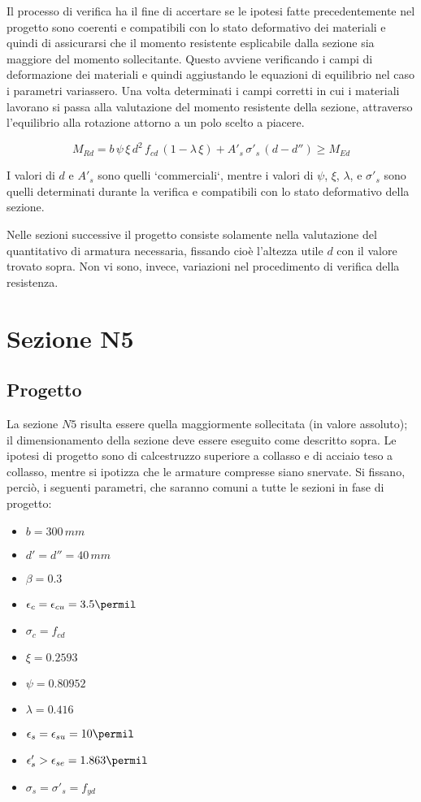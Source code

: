 Il processo di verifica ha il fine di accertare se le ipotesi fatte precedentemente nel progetto sono coerenti e compatibili con lo stato deformativo dei materiali e quindi di assicurarsi che il momento resistente esplicabile dalla sezione sia maggiore del momento sollecitante. Questo avviene verificando i campi di deformazione dei materiali e quindi aggiustando le equazioni di equilibrio nel caso i parametri variassero. Una volta determinati i campi corretti in cui i materiali lavorano si passa alla valutazione del momento resistente della sezione, attraverso l'equilibrio alla rotazione attorno a un polo scelto a piacere. 

\begin{equation}
	\label{eq:MRd}
	M_{Rd} = b\,\psi\,\xi\,d^2\,f_{cd}\,\left(1-\lambda\,\xi\right) + A'_s\,\sigma'_s\,\left(d-d''\right) \geq M_{Ed}
\end{equation}

I valori di $d$ e $A'_s$ sono quelli `commerciali`, mentre i valori di $\psi$, $\xi$, $\lambda$, e $\sigma'_s$ sono quelli determinati durante la verifica e compatibili con lo stato deformativo della sezione.

Nelle sezioni successive il progetto consiste solamente nella valutazione del quantitativo di armatura necessaria, fissando cioè l'altezza utile $d$ con il valore trovato sopra. Non vi sono, invece, variazioni nel procedimento di verifica della resistenza.

\section{Sezione N5}\label{sec:n5}
\subsection{Progetto}
La sezione $N5$ risulta essere quella maggiormente sollecitata (in valore assoluto); il dimensionamento della sezione deve essere eseguito come descritto sopra. Le ipotesi di progetto sono di calcestruzzo superiore a collasso e di acciaio teso a collasso, mentre si ipotizza che le armature compresse siano snervate. Si fissano, perciò, i seguenti parametri, che saranno comuni a tutte le sezioni in fase di progetto:
\begin{itemize}
    \item $b = 300\,mm$
    \item $d' = d'' = 40\,mm$
    \item $\beta = 0.3$
	\item $\epsilon_c = \epsilon_{cu} = 3.5\permil$ 
	\item $\sigma_c = f_{cd}$
    \item $\xi = 0.2593$
    \item $\psi = 0.80952$
    \item $\lambda = 0.416$
	\item $\epsilon_s = \epsilon_{su} = 10\permil$
	\item $\epsilon'_s > \epsilon_{se} = 1.863\permil$
	\item $\sigma_s = \sigma'_s = f_{yd}$
\end{itemize}

